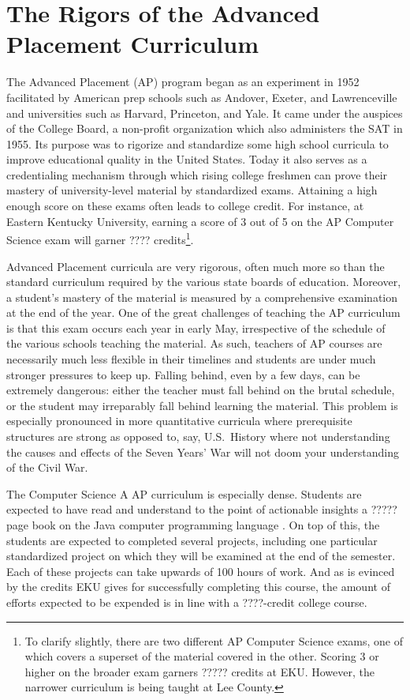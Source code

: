 
\section{The Rigors of the Advanced Placement Curriculum}\label{sec:ap}

The Advanced Placement (AP) program began as an experiment in 1952 facilitated by American prep schools such as Andover, Exeter, and Lawrenceville and universities such as Harvard, Princeton, and Yale. It came under the auspices of the College Board, a non-profit organization which also administers the SAT\autocite{???????} in 1955\autocite{APHistory}.
Its purpose was to rigorize and standardize some high school curricula to
improve educational quality in the United States. Today it also serves as a
credentialing mechanism through which rising college freshmen can prove their
mastery of university-level material by standardized exams. Attaining a high
enough score on these exams often leads to college credit\autocite{AP History}.
For instance, at Eastern Kentucky University, earning a score of 3 out of 5
on the AP Computer Science exam will garner ???? credits\footnote{To clarify
slightly, there are two different AP Computer Science exams, one of which covers
a superset of the material covered in the other. Scoring 3 or higher on the
broader exam garners ????? credits at EKU. However, the narrower curriculum is
being taught at Lee County.}.

Advanced Placement curricula are very rigorous, often much more so than the
standard curriculum required by the various state boards of education. Moreover,
a student's mastery of the material is measured by a comprehensive examination
at the end of the year. One of the great challenges of teaching the AP
curriculum is that this exam occurs each year in early May, irrespective of the
schedule of the various schools teaching the material. As such, teachers of AP
courses are necessarily much less flexible in their timelines and students are
under much stronger pressures to keep up. Falling behind, even by a few days,
can be extremely dangerous: either the teacher must fall behind on the brutal
schedule, or the student may irreparably fall behind learning the material. This
problem is especially pronounced in more quantitative curricula where
prerequisite structures are strong as opposed to, say, U.S.~History where
not understanding the causes and effects of the Seven Years' War will not
doom your understanding of the Civil War.

The Computer Science A AP curriculum is especially dense. Students are expected
to have read and understand to the point of actionable insights a ????? page
book on the Java computer programming language \autocite{the java book, the ap
curriculum}. On top of this, the students are expected to completed several
projects, including one particular standardized project on which they will be
examined at the end of the semester. Each of these projects can take upwards of
100 hours of work. And as is evinced by the credits EKU gives for successfully
completing this course, the amount of efforts expected to be expended is in
line with a ????-credit college course.

